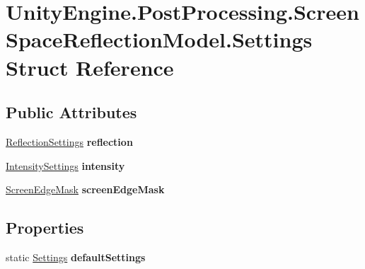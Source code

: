 \hypertarget{struct_unity_engine_1_1_post_processing_1_1_screen_space_reflection_model_1_1_settings}{}\section{Unity\+Engine.\+Post\+Processing.\+Screen\+Space\+Reflection\+Model.\+Settings Struct Reference}
\label{struct_unity_engine_1_1_post_processing_1_1_screen_space_reflection_model_1_1_settings}
\subsection*{Public Attributes}
\begin{DoxyCompactItemize}
\item 
\mbox{\label{struct_unity_engine_1_1_post_processing_1_1_screen_space_reflection_model_1_1_settings_af5e50a060b8a92557f3b27f0ecbcf1f0}} 
\mbox{\hyperlink{struct_unity_engine_1_1_post_processing_1_1_screen_space_reflection_model_1_1_reflection_settings}{Reflection\+Settings}} {\bfseries reflection}
\item 
\mbox{\label{struct_unity_engine_1_1_post_processing_1_1_screen_space_reflection_model_1_1_settings_a379bc477aa7fa436d6838f6919017b2a}} 
\mbox{\hyperlink{struct_unity_engine_1_1_post_processing_1_1_screen_space_reflection_model_1_1_intensity_settings}{Intensity\+Settings}} {\bfseries intensity}
\item 
\mbox{\label{struct_unity_engine_1_1_post_processing_1_1_screen_space_reflection_model_1_1_settings_a3cb099eb427c211492d905039c26d337}} 
\mbox{\hyperlink{struct_unity_engine_1_1_post_processing_1_1_screen_space_reflection_model_1_1_screen_edge_mask}{Screen\+Edge\+Mask}} {\bfseries screen\+Edge\+Mask}
\end{DoxyCompactItemize}
\subsection*{Properties}
\begin{DoxyCompactItemize}
\item 
\mbox{\label{struct_unity_engine_1_1_post_processing_1_1_screen_space_reflection_model_1_1_settings_a911d8f7c6b2e2dddaea49dc9ae8db8b0}} 
static \mbox{\hyperlink{struct_unity_engine_1_1_post_processing_1_1_screen_space_reflection_model_1_1_settings}{Settings}} {\bfseries default\+Settings}
\end{DoxyCompactItemize}


